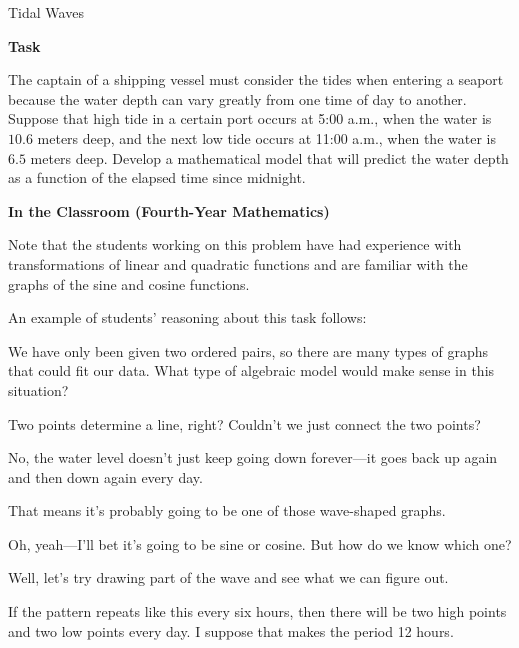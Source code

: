 \TriExample
  {Tidal Waves}
  {
    \textbf{Task}

    The captain of a shipping vessel must consider the tides when entering a seaport because the water depth can vary greatly from one time of day to another. Suppose that high tide in a certain port occurs at 5:00 a.m., when the water is $10.6$ meters deep, and the next low tide occurs at 11:00 a.m., when the water is $6.5$ meters deep. Develop a mathematical model that will predict the water depth as a function of the elapsed time since midnight.

    \textbf{In the Classroom (Fourth-Year Mathematics)}

    Note that the students working on this problem have had experience with transformations of linear and quadratic functions and are familiar with the graphs of the sine and cosine functions.

    An example of students' reasoning about this task follows:

    \begin{scriptlist}
      \item [Teacher:] We have only been given two ordered pairs, so there are many types of graphs that could fit our data. What type of algebraic model would make sense in this situation?

      \item [Student 1:] Two points determine a line, right? Couldn't we just connect the two points?\vspace{\baselineskip}

      \item [Student 2:] No, the water level doesn't just keep going down forever---it goes back up again and then down again every day.

      \item [Student 3:] That means it's probably going to be one of those wave-shaped graphs.

      \item [Student 1:] Oh, yeah---I'll bet it's going to be sine or cosine. But how do we know which one?

      \item [Student 3:] Well, let's try drawing part of the wave and see what we can figure out.

      \item [Student 2:] If the pattern repeats like this every six hours, then there will be two high points and two low points every day. I suppose that makes the period 12 hours.


\end{scriptlist}}
